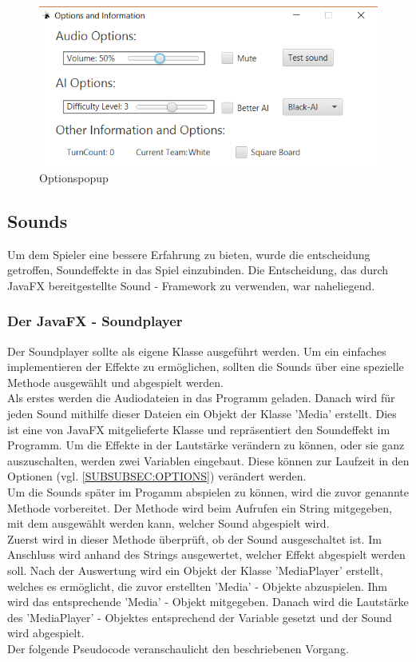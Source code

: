 \documentclass[12pt,a4paper]{article}
\begin{document}
\begin{figure}[H]
  \centering
   	\includegraphics[width=14cm]{graphics/Menu.png}
  \caption{Optionspopup }
  \label{fig:options}
\end{figure}

\newpage
\subsection{Sounds}
Um dem Spieler eine bessere Erfahrung zu bieten, wurde die entscheidung getroffen, Soundeffekte in das Spiel einzubinden. Die Entscheidung, das durch JavaFX bereitgestellte Sound - Framework zu verwenden, war naheliegend.

\subsubsection{Der JavaFX - Soundplayer}
Der Soundplayer sollte als eigene Klasse ausgeführt werden. Um ein einfaches implementieren der Effekte zu ermöglichen, sollten die Sounds über eine spezielle Methode ausgewählt und abgespielt werden. \\
Als erstes werden die Audiodateien in das Programm geladen. Danach wird für jeden Sound  mithilfe dieser Dateien ein Objekt der Klasse 'Media' erstellt. Dies ist eine von JavaFX mitgelieferte Klasse und repräsentiert den Soundeffekt im Programm. Um die Effekte in der Lautstärke verändern zu können, oder sie ganz auszuschalten, werden zwei Variablen eingebaut. Diese können zur Laufzeit in den Optionen (vgl. \ref{SUBSUBSEC:OPTIONS}) verändert werden.\\
Um die Sounds später im Progamm abspielen zu können, wird die zuvor genannte Methode vorbereitet. Der Methode wird beim Aufrufen ein String mitgegeben, mit dem ausgewählt werden kann, welcher Sound abgespielt wird.\\
Zuerst wird in dieser Methode überprüft, ob der Sound ausgeschaltet ist. Im Anschluss wird anhand des Strings ausgewertet, welcher Effekt abgespielt werden soll. Nach der Auswertung wird ein Objekt der Klasse 'MediaPlayer' erstellt, welches es ermöglicht, die zuvor erstellten 'Media' - Objekte abzuspielen. Ihm wird das entsprechende 'Media' - Objekt mitgegeben. Danach wird die Lautstärke des 'MediaPlayer' - Objektes entsprechend der Variable gesetzt und der Sound wird abgespielt. \\
Der folgende Pseudocode veranschaulicht den beschriebenen Vorgang.
\end{document}
